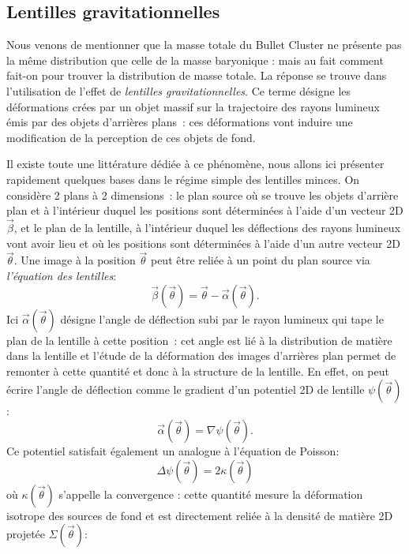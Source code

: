 \subsection{Lentilles gravitationnelles}
Nous venons de mentionner que la masse totale du Bullet Cluster ne présente pas la même distribution que celle de la masse baryonique : mais au fait comment fait-on pour trouver la distribution de masse totale. La réponse se trouve dans l'utilisation de l'effet de \textit{lentilles gravitationnelles}. Ce terme désigne les déformations crées par un objet massif sur la trajectoire des rayons lumineux émis par des objets d'arrières plans~: ces déformations vont induire une modification de la perception de ces objets de fond.

Il existe toute une littérature dédiée à ce phénomène, nous allons ici présenter rapidement quelques bases dans le régime simple des lentilles minces. On considère 2 plans à 2 dimensions~: le plan source où se trouve les objets d'arrière plan et à l'intérieur duquel les positions sont déterminées à l'aide d'un vecteur 2D $\vec{\beta}$, et le plan de la lentille, à l'intérieur duquel les déflections des rayons lumineux vont avoir lieu et où les positions sont déterminées à l'aide d'un autre vecteur 2D $\vec{\theta}$. Une image à la position $\vec{\theta}$ peut être reliée à un point du plan source via \textit{l'équation des lentilles}:
\begin{equation}
\vec{\beta}(\vec{\theta})=\vec{\theta}-\vec{\alpha}(\vec{\theta}).
\end{equation}
Ici $\vec{\alpha}(\vec{\theta})$ désigne l'angle de déflection subi par le rayon lumineux qui tape le plan de la lentille à cette position~: cet angle est lié à la distribution de matière dans la lentille et l'étude de la déformation des images d'arrières plan permet de remonter à cette quantité et donc à la structure de la lentille. En effet, on peut écrire l'angle de déflection comme le gradient d'un potentiel 2D de lentille $\psi(\vec{\theta})$:
\begin{equation}
\vec{\alpha}(\vec{\theta})=\nabla \psi(\vec{\theta}).
\end{equation}
Ce potentiel satisfait également un analogue à l'équation de Poisson:
\begin{equation}
\Delta \psi(\vec{\theta}) = 2 \kappa (\vec{\theta})
\end{equation}
où $\kappa (\vec{\theta})$ s'appelle la convergence : cette quantité mesure la déformation isotrope des sources de fond et est directement reliée à la densité de matière 2D projetée $\Sigma(\vec{\theta})$:
